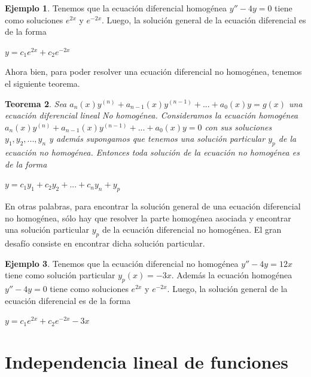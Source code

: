 \documentclass{article}
\theoremstyle{plain}
\newtheorem{thm}{Teorema}[section]
\theoremstyle{definition}
\newtheorem{ejem}[thm]{Ejemplo}
\begin{document}
\begin{ejem}Tenemos que la ecuación diferencial homog\'enea $y''-4y =0$ tiene como soluciones $e^{2x}$ y $e^{-2x}$. Luego, la solución general de la ecuación diferencial es de la forma
\end{ejem}

\begin{center}
$y = c_1e^{2x} +c_2e^{-2x}$
\end{center}

Ahora bien, para poder resolver una ecuación diferencial no homog\'enea, tenemos el siguiente teorema. \\


\begin{thm}Sea $a_n(x)y^{(n)} + a_{n-1}(x)y^{(n-1)}+ ... +a_0(x)y =g(x)$ una ecuación diferencial lineal No homog\'enea. Consideramos la ecuación homog\'enea $a_n(x)y^{(n)} + a_{n-1}(x)y^{(n-1)}+ ... +a_0(x)y =0$ con sus soluciones $y_1,y_2,... , y_n$ y además supongamos que tenemos una solución particular $y_p$ de la ecuación no homog\'enea. Entonces toda solución de la ecuación no homog\'enea es de la forma
\end{thm}

\begin{center}
$y= c_1y_1+c_2y_2+... +c_ny_n +y_p$
\end{center}

En otras palabras, para encontrar la solución general de una ecuación diferencial no homog\'enea, sólo hay que resolver la parte homog\'enea asociada y encontrar una solución particular $y_p$ de la ecuación diferencial no homog\'enea. El gran desafío consiste en encontrar dicha solución particular. \\

\begin{ejem}Tenemos que la ecuación diferencial  no homog\'enea $y''-4y =12x$ tiene como solución particular $y_p(x)= -3x$. Además la ecuación homog\'enea $y''-4y =0$ tiene como soluciones $e^{2x}$ y $e^{-2x}$. Luego, la solución general de la ecuación diferencial es de la forma
\end{ejem}

\begin{center}
$y = c_1e^{2x} +c_2e^{-2x} -3x$
\end{center}


\newpage


\section{Independencia lineal de funciones}
\end{document}
